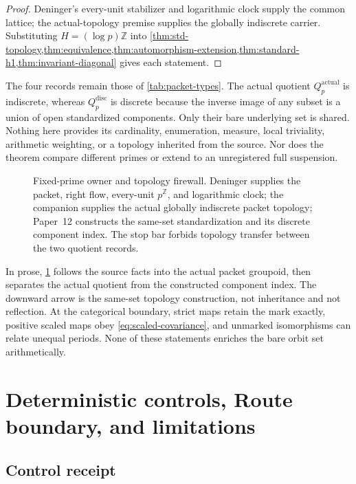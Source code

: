 \documentclass[11pt]{article}
\theoremstyle{definition}
\newcommand{\Z}{\mathbb Z}
\newcommand{\Qactual}{Q_p^{\mathrm{actual}}}
\newcommand{\Qdisc}{Q_p^{\mathrm{disc}}}
\begin{document}
\begin{proof}
Deninger's every-unit stabilizer and logarithmic clock supply the common
lattice; the actual-topology premise supplies the globally indiscrete
carrier.  Substituting $H=(\log p)\Z$ into
\cref{thm:std-topology,thm:equivalence,thm:automorphism-extension,thm:standard-h1,thm:invariant-diagonal}
gives each statement.
\end{proof}

The four records remain those of \cref{tab:packet-types}.  The actual
quotient $\Qactual$ is indiscrete, whereas $\Qdisc$ is discrete because the
inverse image of any subset is a union of open standardized components.
Only their bare underlying set is shared.  Nothing here provides its
cardinality, enumeration, measure, local triviality, arithmetic weighting,
or a topology inherited from the source.  Nor does the theorem compare
different primes or extend to an unregistered full suspension.

\begin{figure}[t]
\centering
\resizebox{\textwidth}{!}{}
\caption{Fixed-prime owner and topology firewall.  Deninger supplies the
packet, right flow, every-unit $p^{\Z}$, and logarithmic clock; the companion
supplies the actual globally indiscrete packet topology; Paper~12 constructs
the same-set standardization and its discrete component index.  The stop bar
forbids topology transfer between the two quotient records.}
\label{fig:packet-four-way-firewall}
\end{figure}

In prose, \cref{fig:packet-four-way-firewall} follows the source facts into
the actual packet groupoid, then separates the actual quotient from the
constructed component index.  The downward arrow is the same-set topology
construction, not inheritance and not reflection.  At the categorical
boundary, strict maps retain the mark exactly, positive scaled maps obey
\cref{eq:scaled-covariance}, and unmarked isomorphisms can relate unequal
periods.  None of these statements enriches the bare orbit set arithmetically.

\FloatBarrier

\section{Deterministic controls, Route boundary, and limitations}
\label{sec:controls-route}

\subsection{Control receipt}
\end{document}
